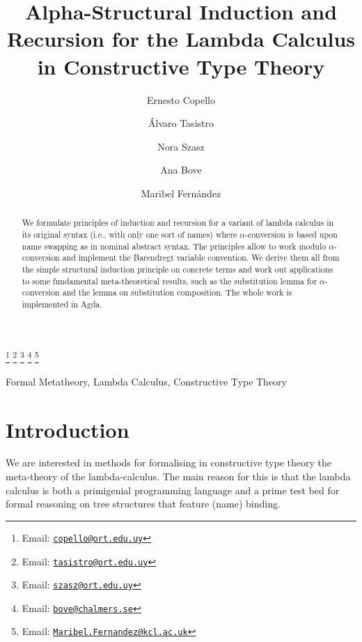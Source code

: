 \documentclass{entcs}
\newcommand{\alp}{\ensuremath{\alpha}}
\begin{document}
\begin{frontmatter}
 \title{Alpha-Structural Induction and Recursion for the Lambda Calculus in Constructive Type Theory}
  \author{Ernesto Copello }
  \author{\'Alvaro Tasistro }
  \author{Nora Szasz }
  \address{Universidad ORT Uruguay\\
      Montevideo, Uruguay}
\author{Ana Bove }
  \address{Chalmers University of Technology\\
    Gothenburg, Sweden}
  \author{Maribel Fern\'andez }
  \address{King's College London\\
      London, England}
  \thanks[emailC]{Email: \href{mailto:copello@ort.edu.uy} {\texttt{\normalshape copello@ort.edu.uy}}}
  \thanks[emailT]{Email: \href{mailto:tasistro@ort.edu.uy} {\texttt{\normalshape tasistro@ort.edu.uy}}} 
  \thanks[emailS]{Email: \href{mailto:szasz@ort.edu.uy} {\texttt{\normalshape szasz@ort.edu.uy}}}
    \thanks[emailB]{Email: \href{mailto:bove@chalmers.se} {\texttt{\normalshape bove@chalmers.se}}}
  \thanks[emailF]{Email: \href{mailto:Maribel.Fernandez@kcl.ac.uk} {\texttt{\normalshape Maribel.Fernandez@kcl.ac.uk}}}

\begin{abstract} 
We formulate principles of induction and recursion for a variant of lambda calculus in its original syntax (i.e., with only one sort of names) where \alp-conversion is based upon name swapping as in nominal abstract syntax. The principles allow to work modulo $\alpha$-conversion and implement the Barendregt variable convention. We derive them all from the simple structural induction principle on concrete terms and work out applications to some fundamental meta-theoretical results, such as the substitution lemma for $\alpha$-conversion and the lemma on substitution composition. The whole work is implemented in Agda.
\end{abstract}

\begin{keyword}
Formal Metatheory, Lambda Calculus, Constructive Type Theory
\end{keyword}

\end{frontmatter}

\maketitle

\section{Introduction}
\label{sec:intro}
We are interested in methods for formalising in constructive type theory the meta-theory of the lambda-calculus. The main reason for this is that the lambda calculus is both a primigenial programming language and a prime test bed
for formal reasoning on tree structures that feature (name) binding. 
\end{document}
